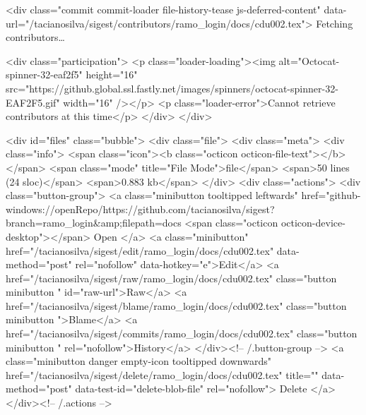   <div class="commit commit-loader file-history-tease js-deferred-content" data-url="/tacianosilva/sigest/contributors/ramo_login/docs/cdu002.tex">
    Fetching contributors…

    <div class="participation">
      <p class="loader-loading"><img alt="Octocat-spinner-32-eaf2f5" height="16" src="https://github.global.ssl.fastly.net/images/spinners/octocat-spinner-32-EAF2F5.gif" width="16" /></p>
      <p class="loader-error">Cannot retrieve contributors at this time</p>
    </div>
  </div>

<div id="files" class="bubble">
  <div class="file">
    <div class="meta">
      <div class="info">
        <span class="icon"><b class="octicon octicon-file-text"></b></span>
        <span class="mode" title="File Mode">file</span>
          <span>50 lines (24 sloc)</span>
        <span>0.883 kb</span>
      </div>
      <div class="actions">
        <div class="button-group">
            <a class="minibutton tooltipped leftwards"
               href="github-windows://openRepo/https://github.com/tacianosilva/sigest?branch=ramo_login&amp;filepath=docs%
                <span class="octicon octicon-device-desktop"></span> Open
            </a>
                <a class="minibutton"
                   href="/tacianosilva/sigest/edit/ramo_login/docs/cdu002.tex"
                   data-method="post" rel="nofollow" data-hotkey="e">Edit</a>
          <a href="/tacianosilva/sigest/raw/ramo_login/docs/cdu002.tex" class="button minibutton " id="raw-url">Raw</a>
            <a href="/tacianosilva/sigest/blame/ramo_login/docs/cdu002.tex" class="button minibutton ">Blame</a>
          <a href="/tacianosilva/sigest/commits/ramo_login/docs/cdu002.tex" class="button minibutton " rel="nofollow">History</a>
        </div><!-- /.button-group -->
          <a class="minibutton danger empty-icon tooltipped downwards"
             href="/tacianosilva/sigest/delete/ramo_login/docs/cdu002.tex"
             title=""
             data-method="post" data-test-id="delete-blob-file" rel="nofollow">
          Delete
        </a>
      </div><!-- /.actions -->


